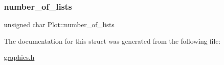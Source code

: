 \mbox{\label{structPlot_ae7098880dbd6c20d2a1447fafea20e7b}} 
\subsubsection{\texorpdfstring{number\+\_\+of\+\_\+lists}{number\_of\_lists}}
{\footnotesize\ttfamily unsigned char Plot\+::number\+\_\+of\+\_\+lists}



The documentation for this struct was generated from the following file\+:\begin{DoxyCompactItemize}
\item 
\hyperlink{graphics_8h}{graphics.\+h}\end{DoxyCompactItemize}
